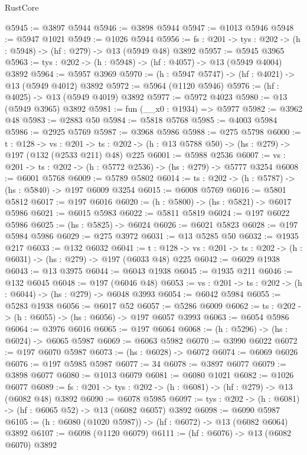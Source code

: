 \begin{lexlean}{RustCore}
\begin{coremodule}
@5945 := @3897 @5944
@5946 := @3898 @5944
@5947 := @1013 @5946
@5948 := @5947 @1021
@5949 := @1026 @5944
@5956 := {fs : @201} -> {tys : @202} -> (h : @5948) -> (hf : @279) -> @13 (@5949 @48) @3892
@5957 := @5945 @3965
@5963 := {tys : @202} -> (h : @5948) -> (hf : @4057) -> @13 (@5949 @4004) @3892
@5964 := @5957 @3969
@5970 := (h : @5947 @5747) -> (hf : @4021) -> @13 (@5949 @4012) @3892
@5972 := @5964 (@1120 @5946)
@5976 := (hf : @4025) -> @13 (@5949 @4019) @3892
@5977 := @5972 @4023
@5980 := @13 (@5949 @3965) @3892
@5981 := fun (__x0 : @1934) => @5977
@5982 := @3962 @48
@5983 := @2883 @50
@5984 := @5818 @5768
@5985 := @4003 @5984
@5986 := @2925 @5769
@5987 := @3968 @5986
@5988 := @275 @5798
@6000 := {t : @128} ->
  {vs : @201} ->
  {ts : @202} -> (h : @13 @5788 @50) -> (hs : @279) -> @197 (@132 (@2533 @211) @48) @225
@6001 := @5988 @2536
@6007 := {vs : @201} -> {ts : @202} -> (h : @5772 @2536) -> (hs : @279) -> @5777 @3254
@6008 := @6001 @5768
@6009 := @5789 @5802
@6014 := {ts : @202} -> (h : @5787) -> (hs : @5840) -> @197 @6009 @3254
@6015 := @6008 @5769
@6016 := @5801 @5812
@6017 := @197 @6016
@6020 := (h : @5800) -> (hs : @5821) -> @6017 @5986
@6021 := @6015 @5983
@6022 := @5811 @5819
@6024 := @197 @6022 @5986
@6025 := (hs : @5825) -> @6024
@6026 := @6021 @5823
@6028 := @197 @5984 @5986
@6029 := @275 @3972
@6031 := @13 @5285 @50
@6032 := @1935 @217
@6033 := @132 @6032
@6041 := {t : @128} ->
  {vs : @201} -> {ts : @202} -> (h : @6031) -> (hs : @279) -> @197 (@6033 @48) @225
@6042 := @6029 @1938
@6043 := @13 @3975
@6044 := @6043 @1938
@6045 := @1935 @211
@6046 := @132 @6045
@6048 := @197 (@6046 @48)
@6053 := {vs : @201} -> {ts : @202} -> (h : @6044) -> (hs : @279) -> @6048 @3993
@6054 := @6042 @5984
@6055 := @5283 @1938
@6056 := @6017 @52
@6057 := @5286 @6009
@6062 := {ts : @202} -> (h : @6055) -> (hs : @6056) -> @197 @6057 @3993
@6063 := @6054 @5986
@6064 := @3976 @6016
@6065 := @197 @6064
@6068 := (h : @5296) -> (hs : @6024) -> @6065 @5987
@6069 := @6063 @5982
@6070 := @3990 @6022
@6072 := @197 @6070 @5987
@6073 := (hs : @6028) -> @6072
@6074 := @6069 @6026
@6076 := @197 @5985 @5987
@6077 := 34
@6078 := @3897 @6077
@6079 := @3898 @6077
@6080 := @1013 @6079
@6081 := @6080 @1021
@6082 := @1026 @6077
@6089 := {fs : @201} -> {tys : @202} -> (h : @6081) -> (hf : @279) -> @13 (@6082 @48) @3892
@6090 := @6078 @5985
@6097 := {tys : @202} -> (h : @6081) -> (hf : @6065 @52) -> @13 (@6082 @6057) @3892
@6098 := @6090 @5987
@6105 := (h : @6080 (@1020 @5987)) -> (hf : @6072) -> @13 (@6082 @6064) @3892
@6107 := @6098 (@1120 @6079)
@6111 := (hf : @6076) -> @13 (@6082 @6070) @3892

\end{coremodule}
\end{lexlean}
